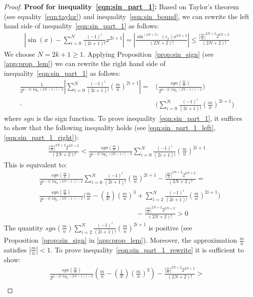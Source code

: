 \documentclass{article}
\numberwithin{mytheorem}{section}
\newcommand{\taylorsin}[3] {\sum_{i=#1}^{#2}\frac{(-1)^i}{(2i+1)!}{#3}^{2i+1}}
\begin{document}
\begin{proof}
\noindent\textbf{Proof for inequality~\eqref{eqn:sin_part_1}:} Based on Taylor's theorem (see equality~\eqref{eqn:taylor}) and inequality~\eqref{eqn:sin_bound}, we can rewrite the left hand side of inequality~\eqref{eqn:sin_part_1} as follows:
\begin{align}
|\sin(x)-\taylorsin{0}{N}{x}|=|\frac{\sin^{(2N+2)}(c_x)x^{2N+2}}{(2N+2)!}|\leq \frac{|\frac{m}{n}|^{2N+2}2^{2N+2}}{(2N+2)!}\label{eqn:sin_part_1_left}
\end{align}
We choose $N=2k+1\geq 1$. Applying Proposition~\ref{prop:sin_sign} (see \ref{app:prop_lem}) we can rewrite the right hand side of inequality~\eqref{eqn:sin_part_1} as follows:
\begin{align}
\frac{1}{2^{p-2\lceil\log_2(2N-1)\rceil-2}}|\taylorsin{0}{N}{(\frac{m}{n})}|=&\bigg(\frac{sgn(\frac{m}{n})}{2^{p-2\lceil\log_2(2N-1)\rceil-2}}\bigg)\nonumber\\
\cdot &\bigg(\taylorsin{0}{N}{(\frac{m}{n})}\bigg)\label{eqn:sin_part_1_right}
\end{align} 
where $sgn$ is the sign function. To prove inequality~\eqref{eqn:sin_part_1}, it suffices to show that the following inequality holds (see \eqref{eqn:sin_part_1_left},\eqref{eqn:sin_part_1_right}):
\begin{align*}
\frac{|\frac{m}{n}|^{2N+2}2^{2N+2}}{(2N+2)!}<\frac{sgn(\frac{m}{n})}{2^{p-2\lceil\log_2(2N-1)\rceil-2}}\taylorsin{0}{N}{(\frac{m}{n})}
\end{align*}
This is equivalent to:
\begin{align}
&\frac{sgn(\frac{m}{n})}{2^{p-2\lceil\log_2(2N-1)\rceil-2}}\taylorsin{0}{N}{(\frac{m}{n})}-\frac{|\frac{m}{n}|^{2N+2}2^{2N+2}}{(2N+2)!}=\nonumber\\
&\frac{sgn(\frac{m}{n})}{2^{p-2\lceil\log_2(2N-1)\rceil-2}}\bigg(\frac{m}{n}-(\frac{1}{3!})(\frac{m}{n})^3+\taylorsin{2}{N}{(\frac{m}{n})}\bigg)\nonumber\\
&\phantom{\frac{sgn(\frac{m}{n})}{2^{p-2\lceil\log_2(2N-1)\rceil-2}}\bigg(\frac{m}{n}-(\frac{1}{3!})(\frac{m}{n})^3}-\frac{|\frac{m}{n}|^{2N+2}2^{2N+2}}{(2N+2)!}>0\label{eqn:sin_part_1_rewrite}
\end{align}
The quantity $sgn(\frac{m}{n})\taylorsin{2}{N}{(\frac{m}{n})}$ is positive (see Proposition~\ref{prop:sin_sign} in \ref{app:prop_lem}). Moreover, the approximation $\frac{m}{n}$ satisfies $|\frac{m}{n}|<1$. To prove inequality~\eqref{eqn:sin_part_1_rewrite} it is sufficient to show:
\begin{align}
\frac{sgn(\frac{m}{n})}{2^{p-2\lceil\log_2(2N-1)\rceil-2}}(\frac{m}{n}-(\frac{1}{3!})(\frac{m}{n})^3)-\frac{|\frac{m}{n}|^{2N+2}2^{2N+2}}{(2N+2)!}>\nonumber\\

\end{align}
\end{proof}
\end{document}
